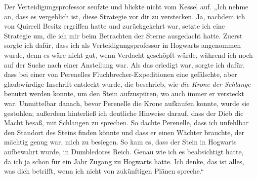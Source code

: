 Der Verteidigungsprofessor seufzte und blickte nicht vom Kessel auf.
„Ich nehme an, dass es vergeblich ist, diese Strategie vor dir zu verstecken. Ja, nachdem ich von Quirrell Besitz ergriffen hatte und zurückgekehrt war, setzte ich eine Strategie um, die ich mir beim Betrachten der Sterne ausgedacht hatte. Zuerst sorgte ich dafür, dass ich als Verteidigungsprofessor in Hogwarts angenommen wurde, denn es wäre nicht gut, wenn Verdacht geschöpft würde, während ich noch auf der Suche nach einer Anstellung war. Als das erledigt war, sorgte ich dafür, dass bei einer von Perenelles Fluchbrecher-Expeditionen eine gefälschte, aber glaubwürdige Inschrift entdeckt wurde, die beschrieb, wie \emph{die Krone der Schlange} benutzt werden konnte, um den Stein aufzuspüren, wo auch immer er versteckt war. Unmittelbar danach, bevor Perenelle die Krone aufkaufen konnte, wurde sie gestohlen; außerdem hinterließ ich deutliche Hinweise darauf, dass der Dieb die Macht besaß, mit Schlangen zu sprechen. So dachte Perenelle, dass ich unfehlbar den Standort des Steins finden könnte und dass er einen Wächter brauchte, der mächtig genug war, mich zu besiegen. So kam es, dass der Stein in Hogwarts aufbewahrt wurde, in Dumbledores Reich. Genau wie ich es beabsichtigt hatte, da ich ja schon für ein Jahr Zugang zu Hogwarts hatte. Ich denke, das ist alles, was dich betrifft, wenn ich nicht von zukünftigen Plänen spreche.“

